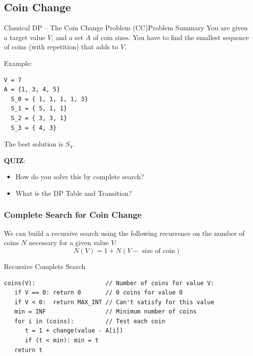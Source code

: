 \subsection{Coin Change}
\begin{frame}[fragile]{Classical DP -- The Coin Change Problem (CC)}{Problem Summary}
  You are given a target value $V$, and a set $A$ of coin sizes. You have to find the smallest sequence of coins (with repetition) that adds to $V$.
  \bigskip

Example:
\begin{verbatim}
V = 7
A = {1, 3, 4, 5}
  S_0 = { 1, 1, 1, 1, 3}
  S_1 = { 5, 1, 1}
  S_2 = { 3, 3, 1}
  S_3 = { 4, 3}
\end{verbatim}

The best solution is $S_3$.\bigskip

{\bf QUIZ}:
\begin{itemize}
  \item How do you solve this by complete search?
  \item What is the DP Table and Transition?
\end{itemize}
\end{frame}

\begin{frame}[fragile]
  \frametitle{Complete Search for Coin Change}

  We can build a recursive search using the following recurrence on the number of coins $N$ necessary for a given value $V$:
  \[N(V) = 1 + N(V-\text{ size of coin})\]

  \begin{block}{Recursive Complete Search}
    {\smaller
\begin{verbatim}
coins(V):                    // Number of coins for value V:
   if V == 0: return 0       // 0 coins for value 0
   if V < 0:  return MAX_INT // Can't satisfy for this value
   min = INF                 // Minimum number of coins
   for i in (coins):         // Test each coin
      t = 1 + change(value - A[i])
      if (t < min): min = t
   return t
\end{verbatim}
  }
  \end{block}
\end{frame}

